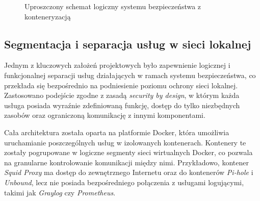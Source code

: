 \documentclass[
    left=2.5cm,         %
    right=2.5cm,        %
    top=2.5cm,          %
    bottom=3cm,         %
    bindingoffset=6mm,  %
    nohyphenation=true %
]{eiti/eiti-thesis} %
\begin{document}
\begin{figure}[H]
\centering
{}
\caption{Uproszczony schemat logiczny systemu bezpieczeństwa z konteneryzacją}
\label{fig:architektura}
\end{figure}

\subsection{Segmentacja i separacja usług w sieci lokalnej}

Jednym z kluczowych założeń projektowych było zapewnienie logicznej i funkcjonalnej separacji usług działających w ramach systemu bezpieczeństwa, co przekłada się bezpośrednio na podniesienie poziomu ochrony sieci lokalnej. Zastosowano podejście zgodne z zasadą \textit{security by design}, w którym każda usługa posiada wyraźnie zdefiniowaną funkcję, dostęp do tylko niezbędnych zasobów oraz ograniczoną komunikację z innymi komponentami.

Cała architektura została oparta na platformie Docker\cite{docker-docs}, która umożliwia uruchamianie poszczególnych usług w izolowanych kontenerach. Kontenery te zostały pogrupowane w logiczne segmenty sieci wirtualnych Docker, co pozwala na granularne kontrolowanie komunikacji między nimi. Przykładowo, kontener \textit{Squid Proxy} ma dostęp do zewnętrznego Internetu oraz do kontenerów \textit{Pi-hole} i \textit{Unbound}, lecz nie posiada bezpośredniego połączenia z usługami logującymi, takimi jak \textit{Graylog} czy \textit{Prometheus}.
\end{document}
